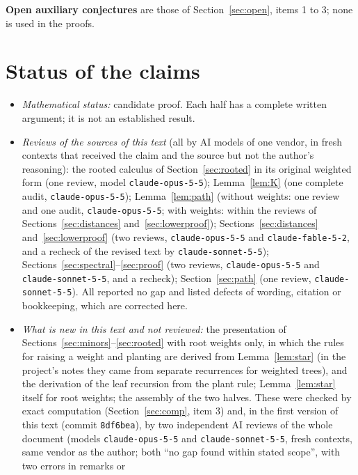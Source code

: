 \documentclass[11pt]{amsart}
\theoremstyle{definition}
\theoremstyle{remark}
\begin{document}
\noindent\textbf{Open auxiliary conjectures} are those of
Section~\ref{sec:open}, items 1 to 3; none is used in the proofs.

\section{Status of the claims}\label{sec:status}

\begin{itemize}
\item \emph{Mathematical status:} candidate proof. Each half has a complete
written argument; it is not an established result.
\item \emph{Reviews of the sources of this text} (all by AI models of one
vendor, in fresh contexts that received the claim and the source but not the
author's reasoning): the rooted calculus of
Section~\ref{sec:rooted} in its original weighted form (one review, model
\nolinkurl{claude-opus-5-5}); Lemma~\ref{lem:K} (one complete audit,
\nolinkurl{claude-opus-5-5}); Lemma~\ref{lem:path} (without weights: one
review and one audit, \nolinkurl{claude-opus-5-5}; with weights: within the
reviews of Sections~\ref{sec:distances} and~\ref{sec:lowerproof}); Sections~\ref{sec:distances}
and~\ref{sec:lowerproof} (two reviews, \nolinkurl{claude-opus-5-5} and
\nolinkurl{claude-fable-5-2}, and a recheck of the revised text by
\nolinkurl{claude-sonnet-5-5}); Sections~\ref{sec:spectral}--\ref{sec:proof}
(two reviews, \nolinkurl{claude-opus-5-5} and \nolinkurl{claude-sonnet-5-5},
and a recheck); Section~\ref{sec:path} (one review,
\nolinkurl{claude-sonnet-5-5}). All reported no gap and listed defects of
wording, citation or bookkeeping, which are corrected here.
\item \emph{What is new in this text and not reviewed:} the presentation of
Sections~\ref{sec:minors}--\ref{sec:rooted} with root weights only, in which
the rules for raising a weight and planting are derived from
Lemma~\ref{lem:star} (in the project's notes they came from separate
recurrences for weighted trees), and the derivation of the leaf recursion
from the plant rule; Lemma~\ref{lem:star} itself for root weights; the
assembly of the two halves. These were checked by exact computation
(Section~\ref{sec:comp}, item 3) and, in the first version of this text
(commit \texttt{8df6bea}), by two independent AI reviews of the whole
document (models \nolinkurl{claude-opus-5-5} and
\nolinkurl{claude-sonnet-5-5}, fresh contexts, same vendor as the author;
both ``no gap found within stated scope'', with two errors in remarks or

\end{itemize}
\end{document}
